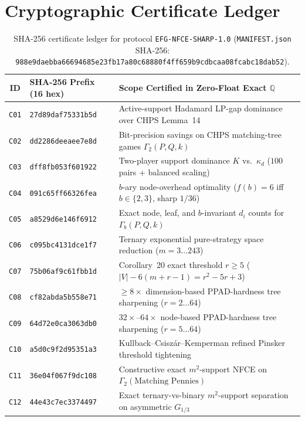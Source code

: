 \documentclass[11pt,a4paper]{article}
\theoremstyle{remark}
\newcommand{\Q}{\mathbb{Q}}
\begin{document}
\appendix

\section{Cryptographic Certificate Ledger}\label{app:certs}

\begin{table}[htbp]
\centering
\caption{SHA-256 certificate ledger for protocol \texttt{EFG-NFCE-SHARP-1.0} (\texttt{MANIFEST.json} SHA-256: \nolinkurl{988e9daebba66694685e23fb17a80c68880f4ff659b9cdbcaa08fcabc18dab52}).}
\label{tab:certs}
\scriptsize
\begin{tabular}{@{}cll@{}}
\toprule
ID & SHA-256 Prefix (16 hex) & Scope Certified in Zero-Float Exact $\Q$ \\
\midrule
\texttt{C01} & \texttt{27d89daf75331b5d} & Active-support Hadamard LP-gap dominance over CHPS Lemma~14 \\
\texttt{C02} & \texttt{dd2286deeaee7e8d} & Bit-precision savings on CHPS matching-tree games $\Gamma_2(P,Q,k)$ \\
\texttt{C03} & \texttt{dff8fb053f601922} & Two-player support dominance $K$ vs.\ $\kappa_d$ ($100$ pairs + balanced scaling) \\
\texttt{C04} & \texttt{091c65ff66326fea} & $b$-ary node-overhead optimality ($f(b)=6$ iff $b\in\{2,3\}$, sharp $1/36$) \\
\texttt{C05} & \texttt{a8529d6e146f6912} & Exact node, leaf, and $b$-invariant $d_i$ counts for $\Gamma_b(P,Q,k)$ \\
\texttt{C06} & \texttt{c095bc4131dce1f7} & Ternary exponential pure-strategy space reduction ($m=3\dots 243$) \\
\texttt{C07} & \texttt{75b06af9c61fbb1d} & Corollary~20 exact threshold $r \ge 5$ ($|V|-6(m+r-1) = r^2-5r+3$) \\
\texttt{C08} & \texttt{cf82abda5b558e71} & $\ge 8\times$ dimension-based PPAD-hardness tree sharpening ($r=2\dots 64$) \\
\texttt{C09} & \texttt{64d72e0ca3063db0} & $32\times$--$64\times$ node-based PPAD-hardness tree sharpening ($r=5\dots 64$) \\
\texttt{C10} & \texttt{a5d0c9f2d95351a3} & Kullback--Csisz\'ar--Kemperman refined Pinsker threshold tightening \\
\texttt{C11} & \texttt{36e04f067f9dc108} & Constructive exact $m^2$-support NFCE on $\Gamma_2(\text{Matching Pennies})$ \\
\texttt{C12} & \texttt{44e43c7ec3374497} & Exact ternary-vs-binary $m^2$-support separation on asymmetric $G_{1/3}$ \\

\end{tabular}
\end{table}
\end{document}
